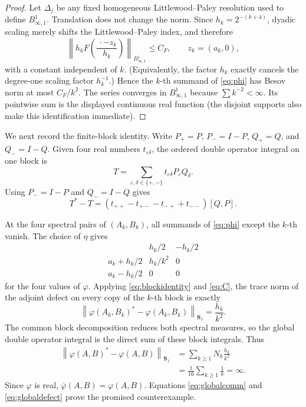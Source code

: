 \documentclass[11pt]{article}
\newcommand{\Sone}{\boldsymbol S_1}
\begin{document}
\begin{proof}
Let $\Delta_j$ be any fixed homogeneous Littlewood--Paley resolution used to
define $B^1_{\infty,1}$.  Translation does not change the norm.  Since
$h_k=2^{-(k+4)}$, dyadic scaling merely shifts the Littlewood--Paley index,
and therefore
\[
 \left\|h_kF\left(\frac{\,\cdot-z_k}{h_k}\right)
 \right\|_{B^1_{\infty,1}}
 \leq C_F,
 \qquad z_k=(a_k,0),
\]
with a constant independent of $k$.  (Equivalently, the factor $h_k$ exactly
cancels the degree-one scaling factor $h_k^{-1}$.)  Hence the $k$-th summand
of \eqref{eq:phi} has Besov norm at most $C_F/k^2$.  The series converges in
$B^1_{\infty,1}$ because $\sum k^{-2}<\infty$.  Its pointwise sum is the
displayed continuous real function (the disjoint supports also make this
identification immediate).
\end{proof}

We next record the finite-block identity.  Write $P_+=P$, $P_-=I-P$,
$Q_+=Q$, and $Q_-=I-Q$.  Given four real numbers $t_{\varepsilon\delta}$,
the ordered double operator integral on one block is
\[
 T=\sum_{\varepsilon,\delta\in\{+,-\}}
 t_{\varepsilon\delta}P_\varepsilon Q_\delta.
\]
Using $P_-=I-P$ and $Q_-=I-Q$ gives
\begin{equation}
 T^*-T=
 (t_{++}-t_{+-}-t_{-+}+t_{--})[Q,P]. \label{eq:blockidentity}
\end{equation}

At the four spectral pairs of $(A_k,B_k)$, all summands of \eqref{eq:phi} except the
$k$-th vanish.  The choice of $\eta$ gives
\[
 \begin{array}{c|cc}
 &h_k/2&-h_k/2\\ \hline
 a_k+h_k/2&h_k/k^2&0\\
 a_k-h_k/2&0&0
 \end{array}
\]
for the four values of $\varphi$.  Applying \eqref{eq:blockidentity} and
\eqref{eq:C}, the trace norm of
the adjoint defect on every copy of the $k$-th block is exactly
\begin{equation}
 \left\|\varphi(A_k,B_k)^*-\varphi(A_k,B_k)\right\|_{\Sone}
 =\frac{h_k}{k^2}. \label{eq:blockdefect}
\end{equation}
The common block decomposition reduces both spectral measures, so the global
double operator integral is the direct sum of these block integrals.  Thus
\begin{equation}
 \begin{split}
 \left\|\varphi(A,B)^*-\varphi(A,B)\right\|_{\Sone}
 &=\sum_{k\geq1}N_k\frac{h_k}{k^2}\\
 &=\frac1{16}\sum_{k\geq1}\frac1k=\infty.
 \end{split}
 \label{eq:globaldefect}
\end{equation}
Since $\varphi$ is real, $\overline\varphi(A,B)=\varphi(A,B)$.  Equations
\eqref{eq:globalcomm} and \eqref{eq:globaldefect} prove the promised
counterexample.
\end{document}
